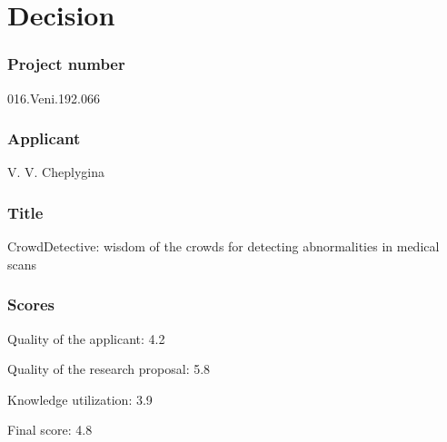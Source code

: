 \documentclass[serif, twocolumn, numeric, rga]{jote-article}
\begin{document}
\section*{Decision}
 {}\subsubsection*{Project number} 
016.Veni.192.066
 {}\subsubsection*{Applicant} 
V. V. Cheplygina
 {}\subsubsection*{Title} 
CrowdDetective: wisdom of the crowds for detecting abnormalities in medical scans
 {}\subsubsection*{Scores} 
Quality of the applicant: 4.2

\noindent Quality of the research proposal: 5.8

\noindent Knowledge utilization: 3.9

\noindent Final score: 4.8
\end{document}
